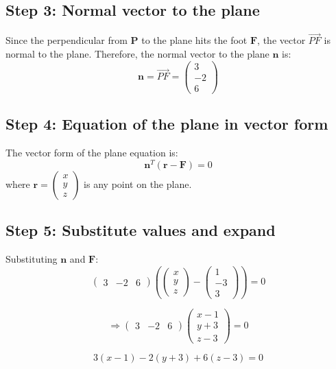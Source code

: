\documentclass[journal]{IEEEtran}
\begin{document}
\subsection*{\textbf{Step 3}: Normal vector to the plane}
Since the perpendicular from \(\mathbf{P}\) to the plane hits the foot \(\mathbf{F}\), the vector \(\vec{PF}\) is normal to the plane. Therefore, the normal vector to the plane \(\mathbf{n}\) is:
\[
\mathbf{n} = \vec{PF} = \begin{pmatrix} 3 \\ -2 \\ 6 \end{pmatrix}
\]

\subsection*{\textbf{Step 4}: Equation of the plane in vector form}
The vector form of the plane equation is:
\[
\mathbf{n}^T (\mathbf{r} - \mathbf{F}) = 0
\]
where \(\mathbf{r} = \begin{pmatrix} x \\ y \\ z \end{pmatrix}\) is any point on the plane.

\subsection*{\textbf{Step 5}: Substitute values and expand}
Substituting \(\mathbf{n}\) and \(\mathbf{F}\):
\[
\begin{pmatrix} 3 & -2 & 6 \end{pmatrix} \left( \begin{pmatrix} x \\ y \\ z \end{pmatrix} - \begin{pmatrix} 1 \\ -3 \\ 3 \end{pmatrix} \right) = 0
\]

\[
\Rightarrow \begin{pmatrix} 3 & -2 & 6 \end{pmatrix} \begin{pmatrix} x-1 \\ y+3 \\ z-3 \end{pmatrix} = 0
\]

\[
3(x-1) - 2(y+3) + 6(z-3) = 0
\]
\end{document}
